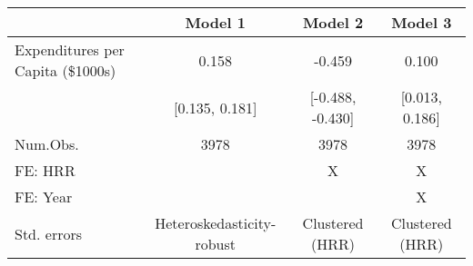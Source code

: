 \begin{table}[H]
\centering
\begin{tabular}[t]{lccc}
\toprule
  & Model 1 & Model 2 & Model 3\\
\midrule
Expenditures per Capita (\$1000s) & 0.158 & -0.459 & 0.100\\
 & [0.135, 0.181] & [-0.488, -0.430] & [0.013, 0.186]\\
\midrule
Num.Obs. & 3978 & 3978 & 3978\\
FE: HRR &  & X & X\\
FE: Year &  &  & X\\
Std. errors & Heteroskedasticity-robust & Clustered (HRR) & Clustered (HRR)\\
\bottomrule
\end{tabular}
\end{table}
